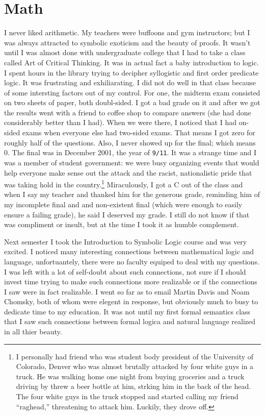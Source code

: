 \section{Math}
I never liked arithmetic. My teachers were buffoons and gym instructors; but I was always attracted to symbolic exoticism and the beauty of proofs. It wasn't until I was almost done with undergraduate college that I had to take a class called Art of Critical Thinking. It was in actual fact a baby introduction to logic. I spent hours in the library trying to decipher syllogistic and first order predicate logic. It was frustrating and exhiliarating. I did not do well in that class because of some intersting factors out of my control. For one, the midterm exam consisted on two sheets of paper, both doubl-sided. I got a bad grade on it and after we got the results went with a friend to coffee shop to compare answers (she had done considerably better than I had). When we were there, I noticed that I had on-sided exams when everyone else had two-sided exams. That means I got zero for roughly half of the questions. Also, I never showed up for the final; which means 0. The final was in December 2001, the year of \texttt{9/11}. It was a strange time and I was a member of student government: we were busy organizing events that would help everyone make sense out the attack and the racist, nationalistic pride that was taking hold in the country.\footnote{I personally had friend who was student body president of the University of Colorado, Denver who was almost brutally attacked by four white guys in a truck. He was walking home one night from buying groceries and a truck driving by threw a beer bottle at him, strking him in the back of the head. The four white guys in the truck stopped and started calling my friend ``raghead,'' threatening to attack him. Luckily, they drove off.} Miraculously, I got a C out of the class and when I say my teacher and thanked him for the generous grade, reminding him of my incomplete final and and non-existent final (which were enough to easily ensure a failing grade), he said I deserved my grade. I still do not know if that was compliment or insult, but at the time I took it as humble complement.

Next semester I took the Introduction to Symbolic Logic course and was very excited. I noticed many interesting connections between mathematical logic and language, unfortuantely, there were no faculty equiped to deal with my questions. I was left with a lot of self-doubt about such connections, not sure if I should invest time trying to make such connections more realizable or if the connections I saw were in fact realizable. I went so far as to email Martin Davis and Noam Chomsky, both of whom were elegent in response, but obviously much to busy to dedicate time to my education. It was not until my first formal semantics class that I saw such connections between formal logica and natural language realized in all thier beauty.


